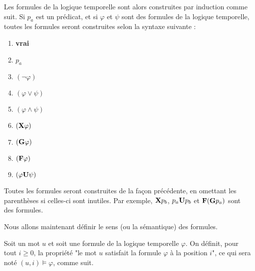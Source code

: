 Les formules de la logique temporelle sont alors construites par induction comme suit. Si $p_a$ est un prédicat, et si $\varphi$ et $\psi$ sont des formules de la logique temporelle, toutes les formules seront construites selon la syntaxe suivante :
\begin{enumerate}
    \item {\bf vrai}
    \item $p_a$
    \item $(\neg \varphi)$
    \item $(\varphi \vee \psi)$
    \item $(\varphi \wedge \psi)$
    \item $({\bf X} \varphi)$
    \item $({\bf G} \varphi)$
    \item $({\bf F} \varphi)$
    \item $(\varphi {\bf U} \psi)$
\end{enumerate}
Toutes les formules seront construites de la façon précédente, en omettant les parenthèses si celles-ci sont inutiles. Par
exemple, ${\bf X} p_b$, $p_a {\bf U} p_b$ et ${\bf F}({\bf G} p_a)$ sont des formules.

\medskip

Nous allons maintenant définir le sens (ou la sémantique) des formules.

Soit un mot $u$ et soit une formule de la logique temporelle $\varphi$. On définit, pour tout $i \ge 0$, la propriété "{\sf le mot $u$ satisfait la formule $\varphi$ à la position $i$}", ce qui sera noté $(u, i) \vDash \varphi$, comme suit. 

